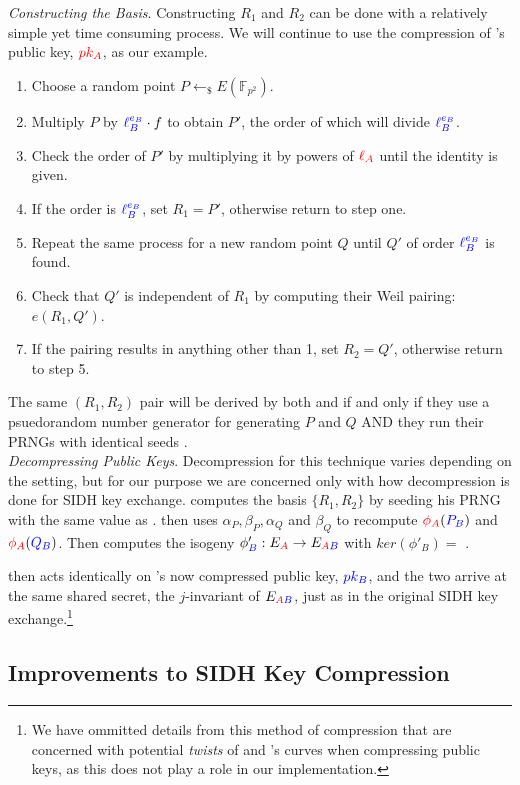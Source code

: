 \noindent
\textit{Constructing the Basis}. Constructing $R_1$ and $R_2$ can be done with a relatively simple yet time consuming process. We will continue to use the compression of \alice's public key, $\textcolor{red}{pk_A}$, as our example.
\begin{enumerate}
\item Choose a random point $P \leftarrow_{\$} E(\mathbb{F}_{p^2})$.
\item Multiply $P$ by $\textcolor{blue}{\ell_{B}^{e_B}} \cdot f$ to obtain $P'$, the order of which will divide $\textcolor{blue}{\ell_{B}^{e_B}}$.
\item Check the order of $P'$ by multiplying it by powers of $\textcolor{red}{\ell_{A}}$ until the identity is given.
\item If the order is $\textcolor{blue}{\ell_{B}^{e_B}}$, set $R_1 = P'$, otherwise return to step one.
\item Repeat the same process for a new random point $Q$ until $Q'$ of order $\textcolor{blue}{\ell_{B}^{e_B}}$ is found.
\item Check that $Q'$ is independent of $R_1$ by computing their Weil pairing: $e(R_1, Q')$.
\item If the pairing results in anything other than 1, set $R_2 = Q'$, otherwise return to step 5.
\end{enumerate}
The same $(R_1, R_2)$ pair will be derived by both \alice and \bob if and only if they use a psuedorandom number generator for generating $P$ and $Q$ AND they run their PRNGs with identical seeds \cite{pwcomp}.\\

\noindent
\textit{Decompressing Public Keys}. Decompression for this technique varies depending on the setting, but for our purpose we are concerned only with how decompression is done for SIDH key exchange. \bob computes the basis $\{R_1, R_2\}$ by seeding his PRNG with the same value as \alice. \bob then uses $\alpha_P, \beta_P, \alpha_Q$ and $\beta_Q$ to recompute $\textcolor{red}{\phi_A}(\textcolor{blue}{P_B})$ and $\textcolor{red}{\phi_A}(\textcolor{blue}{Q_B})$. Then \bob computes the isogeny $\phi'_{\textcolor{blue}{B}} : E_{\textcolor{red}{A}} \rightarrow E_{\textcolor{red}{A}\textcolor{blue}{B}}$ with $ker(\phi'_{B}) =$ \cite{compwr}. 

\alice then acts identically on \bob's now compressed public key, $\textcolor{blue}{pk_B}$, and the two arrive at the same shared secret, the $j$-invariant of $E_{\textcolor{red}{A}\textcolor{blue}{B}}$, just as in the original SIDH key exchange.\footnote{We have ommitted details from this method of compression that are concerned with potential \textit{twists} of \alice and \bob's curves when compressing public keys, as this does not play a role in our implementation. }

\subsection{Improvements to SIDH Key Compression}
\label{subsec:costcompression}

